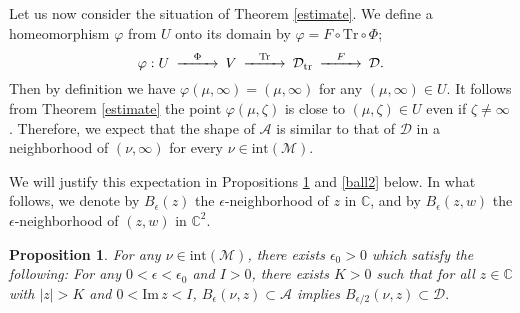 \documentclass[12pt]{article}
\theoremstyle{plain}
\newtheorem{prop}[thm]{Proposition}
\theoremstyle{definition}
\theoremstyle{remark}
\newcommand{\C}{\mathbb C}
\newcommand{\D}{\mathcal D}
\newcommand{\M}{\mathcal M}
\newcommand{\A}{\mathcal A}
\newcommand{\fty}{\infty}
\newcommand{\ep}{\epsilon}
\newcommand{\ze}{\zeta}
\newcommand{\tr}{{\mathrm{tr}}}
\newcommand{\Tr}{{\mathrm{Tr}}}
\newcommand{\inte}{\mathrm{int}}
\newcommand{\im}{\mathrm{Im}}
\begin{document}
Let us now consider the situation of Theorem \ref{estimate}. 
We define a homeomorphism $\varphi$ from $U$ onto  its domain by 
$\varphi=F \circ   \Tr \circ \Phi$; 
%
\begin{eqnarray*}
\begin{CD}
\varphi:U@>{\Phi}>> V  @>{\Tr}>> \D_\tr @>{F}>> \D. 
\end{CD}
\end{eqnarray*}
%
Then by definition we have  $\varphi(\mu,\fty)=(\mu,\fty)$ for any $(\mu,\fty) \in U$. 
It follows from Theorem \ref{estimate} 
the point $\varphi(\mu,\ze)$ is close to $(\mu,\ze) \in U$ even if $\ze \ne \fty$. 
Therefore,  we expect that the shape of $\A$ is similar to  that of $\D$ in a neighborhood of $(\nu,\fty)$ 
for every $\nu \in \inte(\M)$. 

We will justify this expectation  in Propositions \ref{ball1} and \ref{ball2} below.   
In what follows, we denote by $B_\ep(z)$ the $\ep$-neighborhood of $z$ in $\C$, and 
 by  $B_\ep(z,w)$ the $\ep$-neighborhood of $(z,w)$ in $\C^2$. 


\begin{prop}\label{ball1}
For any $\nu \in \inte(\M)$, there exists $\ep_0>0$ which satisfy the following: 
For any $0<\ep<\ep_0$ and $I>0$, there exists $K>0$ such that 
for all $z \in \C$ with $|z|>K$ and $0<\im\,z<I$, 
$
B_\ep(\nu,z) \subset \A
$
implies
$
B_{\ep/2}(\nu,z) \subset \D. 
$
\end{prop}
\end{document}
